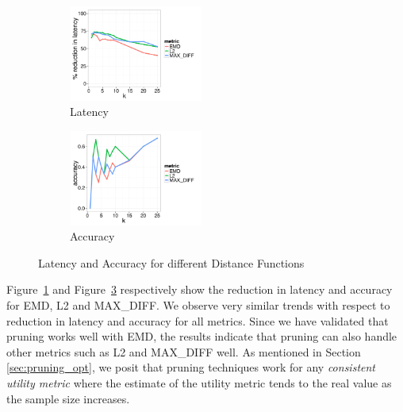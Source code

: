 {%

\begin{figure}[h]
	\centering
	\vspace*{-10pt}
	\begin{subfigure}{0.48\linewidth}
		\centering
		\includegraphics[width=4.4cm] {Images/in_memory_diff_metrics_latency.pdf}
		\vspace{-15pt}
		\caption{Latency}
		\label{fig:dist_latency}
	\end{subfigure}
	\begin{subfigure}{0.48\linewidth}
		\centering
		\includegraphics[width=4.4cm] {Images/in_memory_diff_metrics_accuracy.pdf}
		\vspace{-15pt}
		\caption{Accuracy}
		\label{fig:dist_accuracy}
	\end{subfigure}
	\vspace{-10pt}
\caption{Latency and Accuracy for different Distance Functions}	
		\vspace{-10pt}
\end{figure}

Figure~\ref{fig:dist_latency} and Figure~\ref{fig:dist_accuracy}
respectively show the reduction in latency and accuracy for EMD,
L2 and MAX\_DIFF.
We observe very similar trends with respect to reduction in latency
and accuracy for all metrics.
Since we have validated that pruning works well with EMD, the
results indicate that pruning can also handle other metrics such as
L2 and MAX\_DIFF well.
As mentioned in Section \ref{sec:pruning_opt}, we posit that pruning
techniques work for any {\em consistent utility metric} where the 
estimate of the utility metric tends to the real value as the sample
size increases.

}
